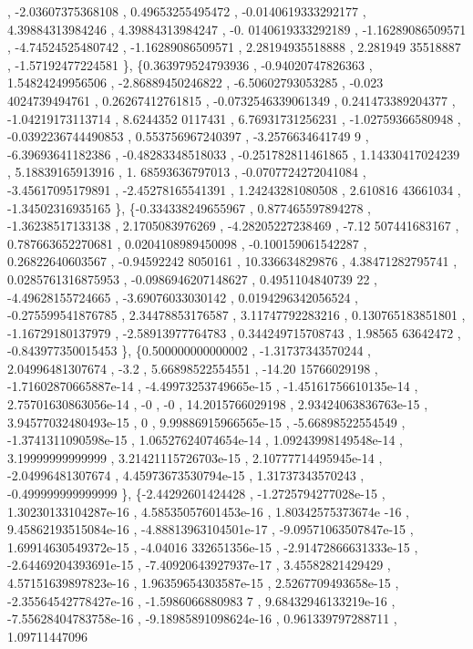 \begin{DoxyCode}
       , -2.03607375368108 ,  0.49653255495472 , -0.0140619333292177 ,  4.39884313984246 ,  4.39884313984247 , -0.
      0140619333292189 , -1.16289086509571 , -4.74524525480742 , -1.16289086509571 ,  2.28194935518888 ,  2.281949
      35518887 , -1.57192477224581 \},
\{0.363979524793936 , -0.94020747826363 ,  1.54824249956506 , -2.86889450246822 , -6.50602793053285 , -0.023
      4024739494761 ,  0.26267412761815 , -0.0732546339061349 , 0.241473389204377 , -1.04219173113714 ,  8.6244352
      0117431 ,  6.76931731256231 , -1.02759366580948 , -0.0392236744490853 , 0.553756967240397 , -3.2576634641749
      9 , -6.39693641182386 , -0.48283348518033 , -0.251782811461865 ,  1.14330417024239 ,  5.18839165913916 ,  1.
      68593636797013 , -0.0707724272041084 , -3.45617095179891 , -2.45278165541391 ,  1.24243281080508 ,  2.610816
      43661034 , -1.34502316935165 \},
\{-0.334338249655967 , 0.877465597894278 , -1.36238517133138 ,   2.1705083976269 , -4.28205227238469 , -7.12
      507441683167 , 0.787663652270681 , 0.0204108989450098 , -0.100159061542287 ,  0.26822640603567 , -0.94592242
      8050161 ,   10.336634829876 ,  4.38471282795741 , 0.0285761316875953 , -0.0986946207148627 , 0.4951104840739
      22 , -4.49628155724665 , -3.69076033030142 , 0.0194296342056524 , -0.275599541876785 ,  2.34478853176587 ,  
      3.11747792283216 , 0.130765183851801 , -1.16729180137979 , -2.58913977764783 , 0.344249715708743 ,   1.98565
      63642472 , -0.843977350015453 \},
\{0.500000000000002 , -1.31737343570244 ,  2.04996481307674 ,              -3.2 ,  5.66898522554551 , -14.20
      15766029198 , -1.71602870665887e-14 , -4.49973253749665e-15 , -1.45161756610135e-14 , 2.75701630863056e-14 ,
                      -0 ,                -0 ,  14.2015766029198 , 2.93424063836763e-15 , 3.94577032480493e-15 ,  
                     0 , 9.99886915966565e-15 , -5.66898522554549 , -1.3741311090598e-15 , 1.06527624074654e-14 , 
      1.09243998149548e-14 ,  3.19999999999999 , 3.21421115726703e-15 , 2.10777714495945e-14 , -2.04996481307674 ,
       4.45973673530794e-15 ,  1.31737343570243 , -0.499999999999999 \},
\{-2.44292601424428 , -1.2725794277028e-15 , 1.30230133104287e-16 , 4.58535057601453e-16 , 1.80342575373674e
      -16 , 9.45862193515084e-16 , -4.88813963104501e-17 , -9.09571063507847e-15 , 1.69914630549372e-15 , -4.04016
      332651356e-15 , -2.91472866631333e-15 , -2.64469204393691e-15 , -7.40920643927937e-17 ,  3.45582821429429 , 
      4.57151639897823e-16 , 1.96359654303587e-15 , 2.5267709493658e-15 , -2.35564542778427e-16 , -1.5986066880983
      7 , 9.68432946133219e-16 , -7.55628404783758e-16 , -9.18985891098624e-16 , 0.961339797288711 , 1.09711447096

\end{DoxyCode}
